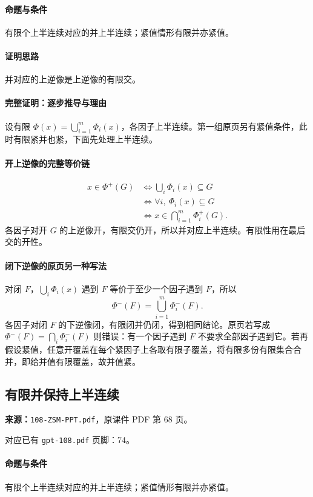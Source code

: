 \paragraph{命题与条件}有限个上半连续对应的并上半连续；紧值情形有限并亦紧值。
\paragraph{证明思路}并对应的上逆像是上逆像的有限交。
\paragraph{完整证明：逐步推导与理由}

设有限 $\Phi(x)=\bigcup_{i=1}^m\Phi_i(x)$，各因子上半连续。第一组原页另有紧值条件，此时有限紧并也紧，下面先处理上半连续。
\paragraph{开上逆像的完整等价链}
\begin{align*}
x\in\Phi^+(G)&\iff\bigcup_i\Phi_i(x)\subseteq G\\
&\iff\forall i,\ \Phi_i(x)\subseteq G\\
&\iff x\in\bigcap_{i=1}^m\Phi_i^+(G).
\end{align*}
各因子对开 $G$ 的上逆像开，有限交仍开，所以并对应上半连续。有限性用在最后交的开性。
\paragraph{闭下逆像的原页另一种写法}
对闭 $F$，$\bigcup_i\Phi_i(x)$ 遇到 $F$ 等价于至少一个因子遇到 $F$，所以
\[\Phi^-(F)=\bigcup_{i=1}^m\Phi_i^-(F).\]
各因子对闭 $F$ 的下逆像闭，有限闭并仍闭，得到相同结论。原页若写成 $\Phi^-(F)=\bigcap_i\Phi_i^-(F)$ 则错误：有一个因子遇到 $F$ 不要求全部因子遇到它。若再假设紧值，任意开覆盖在每个紧因子上各取有限子覆盖，将有限多份有限集合合并，即给并值有限覆盖，故并值紧。

\clearpage\subsection{有限并保持上半连续}
\textbf{来源：}\texttt{108-ZSM-PPT.pdf}，原课件 PDF 第 68 页。\par
对应已有 \texttt{gpt-108.pdf} 页脚：74。\par
\paragraph{命题与条件}有限个上半连续对应的并上半连续；紧值情形有限并亦紧值。
